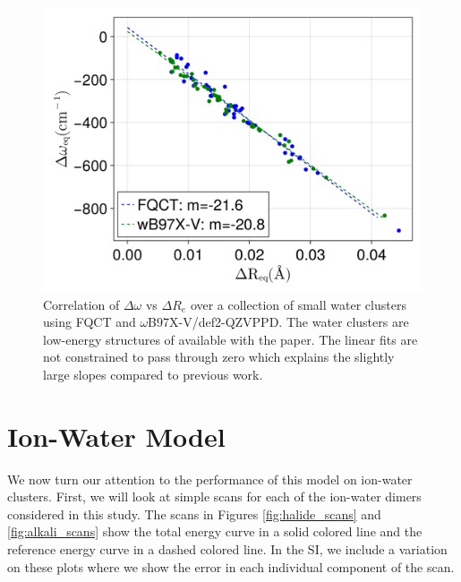 \documentclass[journal=jacsat,manuscript=article]{achemso}
\begin{document}
\begin{figure}[h]
  \includegraphics*[width=\textwidth]{figures/badger_correlation_final.png}
  \caption{Correlation of $\Delta\omega$ vs $\Delta R_e$ over a collection
  of small water clusters using FQCT and $\omega$B97X-V/def2-QZVPPD.
  The water clusters are low-energy structures of  available
  with the paper. The linear fits are not constrained to pass through zero
  which explains the slightly large slopes compared to previous work.\cite{boyer2019beyond}
}
  \label{fig:badger}
\end{figure}

\section*{Ion-Water Model}

We now turn our attention to the performance of this model on ion-water clusters. First, we will look at simple scans for each of the ion-water dimers considered in this study. The scans in Figures \ref{fig:halide_scans} and \ref{fig:alkali_scans} show the total energy curve in a solid colored line and the reference energy curve in a dashed colored line. In the SI, we include a variation on these plots where we show the error in each individual component of the scan.
\end{document}
